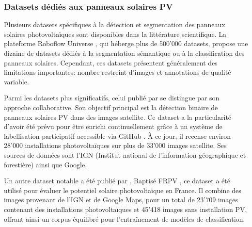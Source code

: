 {{{{\subsubsection{Datasets dédiés aux panneaux solaires PV}
\par{Plusieurs datasets spécifiques à la détection et segmentation des panneaux solaires photovoltaïques sont disponibles dans la littérature scientifique. La plateforme Roboflow Universe \cite{roboflow_roboflow_nodate}, qui héberge plus de 500'000 datasets, propose une dizaine de datasets dédiés à la segmentation sémantique ou à la classification des panneaux solaires. Cependant, ces datasets présentent généralement des limitations importantes: nombre restreint d'images et annotations de qualité variable.}
\par{Parmi les datasets plus significatifs, celui publié par \citeauthor{kasmi_crowdsourced_2023} \cite{kasmi_crowdsourced_2023, kasmi_crowdsourced_2022} se distingue par son approche collaborative. Son objectif principal est la détection binaire de panneaux solaires PV dans des images satellite. Ce dataset a la particularité d'avoir été prévu pour être enrichi continuellement grâce à un système de labellisation participatif accessible via GitHub \cite{gabrielkasmi_gabrielkasmibdappv_2025}. À ce jour, il recense environ 28'000 installations photovoltaïques sur plus de 33'000 images satellite. Ses sources de données sont l'IGN (Institut national de l'information géographique et forestière) ainsi que Google.}
\par{Un autre dataset notable a été publié par \citeauthor{thebault_comprehensive_2025} \cite{thebault_comprehensive_2025}. Baptisé FRPV \cite{thebault_frpv_2025}, ce dataset a été utilisé pour évaluer le potentiel solaire photovoltaïque en France. Il combine des images provenant de l'IGN et de Google Maps, pour un total de 23'709 images contenant des installations photovoltaïques et 45'418 images sans installation PV, offrant ainsi un corpus équilibré pour l'entraînement de modèles de classification.}

}}}}
